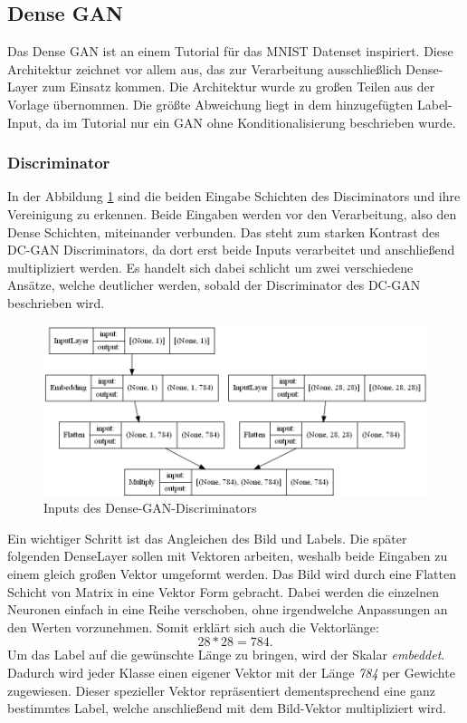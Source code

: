 \subsection{Dense GAN}
\label{section:dense-gan}
Das Dense GAN ist an einem Tutorial für das MNIST Datenset inspiriert.
Diese Architektur zeichnet vor allem aus, das zur Verarbeitung ausschließlich Dense-Layer zum Einsatz kommen.
Die Architektur wurde zu großen Teilen aus der Vorlage übernommen.
Die größte Abweichung liegt in dem hinzugefügten Label-Input, da im Tutorial nur ein GAN ohne Konditionalisierung beschrieben wurde.

\subsubsection{Discriminator}
In der Abbildung \ref{architecture:densegan-dis-input} sind die beiden Eingabe Schichten des Disciminators und ihre Vereinigung zu erkennen.
Beide Eingaben werden vor den Verarbeitung, also den Dense Schichten, miteinander verbunden.
Das steht zum starken Kontrast des DC-GAN Discriminators, da dort erst beide Inputs verarbeitet und anschließend multipliziert werden.
Es handelt sich dabei schlicht um zwei verschiedene Ansätze, welche deutlicher werden, sobald der Discriminator des DC-GAN beschrieben wird.

\begin{figure}[H]
	\centering
	\includegraphics[height=0.3\textheight]{kapitel/5_ergebnisse/architectures/densegan_discriminator/inputs.png}
	\caption{Inputs des Dense-GAN-Discriminators}
	\label{architecture:densegan-dis-input}
\end{figure}

Ein wichtiger Schritt ist das Angleichen des Bild und Labels.
Die später folgenden DenseLayer sollen mit Vektoren arbeiten, weshalb beide Eingaben zu einem gleich großen Vektor umgeformt werden.
Das Bild wird durch eine Flatten Schicht von Matrix in eine Vektor Form gebracht. 
Dabei werden die einzelnen Neuronen einfach in eine Reihe verschoben, ohne irgendwelche Anpassungen an den Werten vorzunehmen.
Somit erklärt sich auch die Vektorlänge: \begin{equation}
	28 * 28 = 784.
\end{equation}
Um das Label auf die gewünschte Länge zu bringen, wird der Skalar \textit{embeddet}.
Dadurch wird jeder Klasse einen eigener Vektor mit der Länge \textit{784} per Gewichte zugewiesen.
Dieser spezieller Vektor repräsentiert dementsprechend eine ganz bestimmtes Label, welche anschließend mit dem Bild-Vektor multipliziert wird.
\newline

